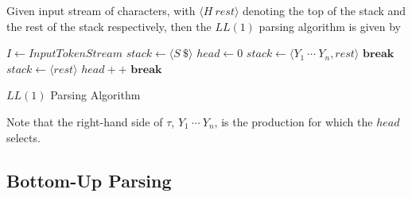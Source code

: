 \begin{definition}
    Given input stream of characters, with $\langle H\ rest \rangle$ denoting the top of the stack and the rest of the stack respectively, then the $LL(1)$ parsing algorithm is given by
    \begin{algorithm}[H]
        \begin{algorithmic}[1]
                \State $I \gets InputTokenStream$
                \State $stack \gets \langle S\ \$ \rangle$
                \State $head \gets 0$
                \Repeat
                                \State $stack \gets \langle Y_1\ \cdots\ Y_n, rest \rangle$
                            \Else
                                \State {}
                            \EndIf
                            \State $\textbf{break}$
                        \EndCase
                                \State $stack \gets \langle rest \rangle$
                                \State $head{+}{+}$
                            \Else
                                \State {}
                            \EndIf
                            \State $\textbf{break}$
                        \EndCase
                    \EndSwitch
            \EndProcedure
        \end{algorithmic}
        \caption{$LL(1)$ Parsing Algorithm}
        \label{prog:ll1-parsing-algorithm}
    \end{algorithm}
    
    Note that the right-hand side of $\tau$, $Y_1\ \cdots\ Y_n$, is the production for which the $head$ selects.
\end{definition}

\subsection{Bottom-Up Parsing}
